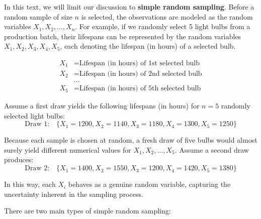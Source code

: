 \documentclass[twoside]{book}
\begin{document}
In this text, we will limit our discussion to \textbf{simple random sampling}.  Before a random sample of size $n$ is selected, the observations are modeled as the random variables $X_1 , X_2, \dots , X_n$. For example, if we randomly select 5 light bulbs from a production batch, their lifespans can be represented by the random variables \( X_1, X_2, X_3, X_4, X_5 \), each denoting the lifespan (in hours) of a selected bulb.

\begin{align*}
    X_1 &= \text{Lifespan (in hours) of 1st selected bulb} \\
    X_2 &= \text{Lifespan (in hours) of 2nd selected bulb} \\
    &\dots \\
    X_5 &= \text{Lifespan (in hours) of 5th selected bulb}
\end{align*}


Assume a first draw yields the following lifespans (in hours) for \(n = 5\) randomly selected light bulbs:
\[
\text{Draw 1:} \quad \{X_1=1200, X_2=1140, X_3=1180, X_4=1300, X_5=1250\}
\]

Because each sample is chosen at random, a fresh draw of five bulbs would almost surely yield different numerical values for \(X_1, X_2, \dots, X_5\). Assume a second draw produces:
\[
\text{Draw 2:} \quad \{X_1=1400, X_2=1550, X_3=1200, X_4=1420, X_5=1380\}
\]

In this way, each \(X_i\) behaves as a genuine random variable, capturing the uncertainty inherent in the sampling process.

There are two main types of simple random sampling:
\end{document}
